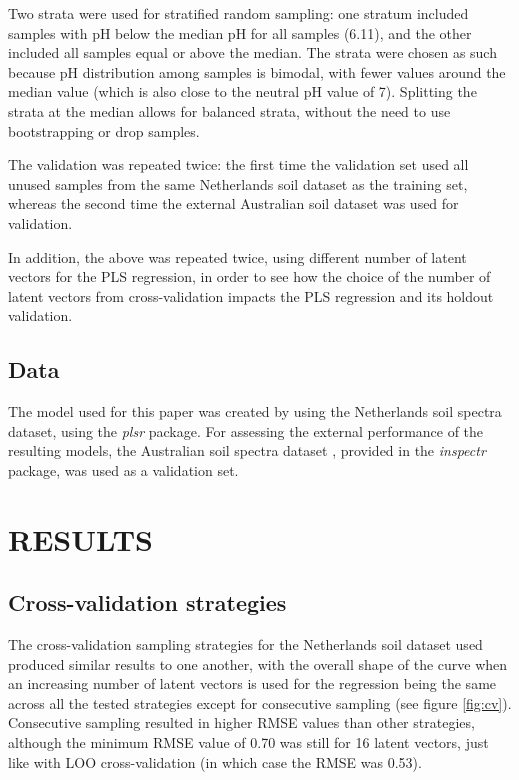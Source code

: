 \documentclass{isprs}
\begin{document}
Two strata were used for stratified random sampling: one stratum included samples with pH below the median pH for all samples (6.11), and the other included all samples equal or above the median. The strata were chosen as such because pH distribution among samples is bimodal, with fewer values around the median value (which is also close to the neutral pH value of 7). Splitting the strata at the median allows for balanced strata, without the need to use bootstrapping or drop samples.

The validation was repeated twice: the first time the validation set used all unused samples from the same Netherlands soil dataset as the training set, whereas the second time the external Australian soil dataset was used for validation.

In addition, the above was repeated twice, using different number of latent vectors for the PLS regression, in order to see how the choice of the number of latent vectors from cross-validation impacts the PLS regression and its holdout validation.

\subsection{Data}\label{sec:Data}

The model used for this paper was created by using the Netherlands soil spectra dataset, using the \textit{plsr} package. For assessing the external performance of the resulting models, the Australian soil spectra dataset \cite{rossel2010using}, provided in the \textit{inspectr} package, was used as a validation set.

\section{RESULTS}\label{sec:RESULTS}

\subsection{Cross-validation strategies}\label{sec:Cross-validation strategies 2}

The cross-validation sampling strategies for the Netherlands soil dataset used produced similar results to one another, with the overall shape of the curve when an increasing number of latent vectors is used for the regression being the same across all the tested strategies except for consecutive sampling (see figure \ref{fig:cv}). Consecutive sampling resulted in higher RMSE values than other strategies, although the minimum RMSE value of 0.70 was still for 16 latent vectors, just like with LOO cross-validation (in which case the RMSE was 0.53).
\end{document}
